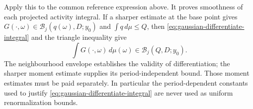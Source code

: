 Apply this to the common reference expression above. It proves
smoothness of each projected activity integral. If a sharper
estimate at the base point gives
$G(\cdot,\omega)\in\mathcal B_j(q(\omega),D;y_0)$ and
$\int q\,d\mu\le Q$, then
\eqref{eq:gaussian-differentiate-integral} and the triangle
inequality give
\[
 \int G(\cdot,\omega)\,d\mu(\omega)
            \in\mathcal B_j(Q,D;y_0).
\]
The neighbourhood envelope establishes the validity of
differentiation; the sharper moment estimate supplies its
period-independent bound. Those moment estimates must be paid
separately. In particular the period-dependent constants used to
justify \eqref{eq:gaussian-differentiate-integral} are never used
as uniform renormalization bounds.
